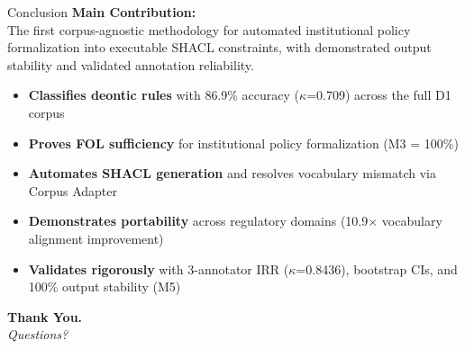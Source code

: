 \documentclass[aspectratio=169, 10pt]{beamer}
\begin{document}
\begin{frame}{Conclusion}
    \textbf{Main Contribution:} \\
    The first corpus-agnostic methodology for automated institutional policy formalization into executable SHACL constraints, with demonstrated output stability and validated annotation reliability.
    
    \vspace{0.3cm}
    \begin{itemize}
        \item \textbf{Classifies deontic rules} with 86.9\% accuracy ($\kappa$=0.709) across the full D1 corpus
        \item \textbf{Proves FOL sufficiency} for institutional policy formalization (M3 = 100\%)
        \item \textbf{Automates SHACL generation} and resolves vocabulary mismatch via Corpus Adapter
        \item \textbf{Demonstrates portability} across regulatory domains (10.9$\times$ vocabulary alignment improvement)
        \item \textbf{Validates rigorously} with 3-annotator IRR ($\kappa$=0.8436), bootstrap CIs, and 100\% output stability (M5)
    \end{itemize}
    
    \vspace{0.5cm}
    \centering
    \Large \textbf{Thank You.} \\
    \normalsize \textit{Questions?}
\end{frame}


\appendix
\end{document}
